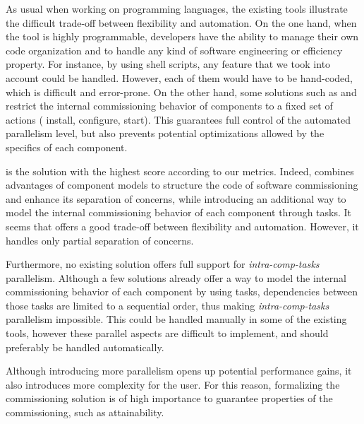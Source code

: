 As usual when working on programming languages, the existing tools
illustrate the difficult trade-off between flexibility and
automation. On the one hand, when the tool is highly programmable,
developers have the ability to manage their own code organization and
to handle any kind of software engineering or efficiency property. For
instance, by using shell scripts, any feature that we took into
account could be handled. However, each of them would have to be
hand-coded, which is difficult and error-prone. On the other hand,
some solutions such as \deployware and \juju restrict the internal
commissioning behavior of components to a fixed set of actions (\eg
install, configure, start). This guarantees full control of the
automated parallelism level, but also prevents potential optimizations
allowed by the specifics of each component.

\aeolus is the solution with the highest score according to our
metrics. Indeed, \aeolus combines advantages of component models to
structure the code of software commissioning and enhance its
separation of concerns, while introducing an additional way to model
the internal commissioning behavior of each component through
tasks. It seems that \aeolus offers a good trade-off between
flexibility and automation. However, it handles only partial
separation of concerns.

Furthermore, no existing solution offers full support for
\emph{intra-comp-tasks} parallelism. Although a few solutions already
offer a way to model the internal commissioning behavior of each
component by using tasks, dependencies between those tasks are limited
to a sequential order, thus making \emph{intra-comp-tasks} parallelism
impossible. This could be handled manually in some of the existing
tools, however these parallel aspects are difficult to implement, and
should preferably be handled automatically.

Although introducing more parallelism opens up potential performance
gains, it also introduces more complexity for the user. For this
reason, formalizing the commissioning solution is of high importance
to guarantee properties of the commissioning, such as attainability.


